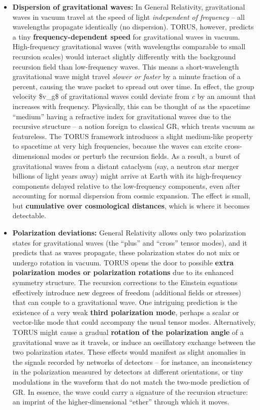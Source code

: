 \begin{itemize}
\item
  \textbf{Dispersion of gravitational waves:} In General Relativity,
  gravitational waves in vacuum travel at the speed of light
  \emph{independent of frequency} -- all wavelengths propagate
  identically (no dispersion). TORUS, however, predicts a tiny
  \textbf{frequency-dependent speed} for gravitational waves in vacuum​.
  High-frequency gravitational waves (with wavelengths comparable to
  small recursion scales) would interact slightly differently with the
  background recursion field than low-frequency waves. This means a
  short-wavelength gravitational wave might travel \emph{slower or
  faster} by a minute fraction of a percent, causing the wave packet to
  spread out over time. In effect, the group velocity \$v\_g\$ of
  gravitational waves could deviate from \emph{c} by an amount that
  increases with frequency​. Physically, this can be thought of as the
  spacetime ``medium'' having a refractive index for gravitational waves
  due to the recursive structure -- a notion foreign to classical GR,
  which treats vacuum as featureless. The TORUS framework introduces a
  slight medium-like property to spacetime at very high frequencies,
  because the waves can excite cross-dimensional modes or perturb the
  recursion fields. As a result, a burst of gravitational waves from a
  distant cataclysm (say, a neutron star merger billions of light years
  away) might arrive at Earth with its high-frequency components delayed
  relative to the low-frequency components, even after accounting for
  normal dispersion from cosmic expansion. The effect is small, but
  \textbf{cumulative over cosmological distances}, which is where it
  becomes detectable​.
\item
  \textbf{Polarization deviations:} General Relativity allows only two
  polarization states for gravitational waves (the ``plus'' and
  ``cross'' tensor modes), and it predicts that as waves propagate,
  these polarization states do not mix or undergo rotation in vacuum.
  TORUS opens the door to possible \textbf{extra polarization modes or
  polarization rotations} due to its enhanced symmetry structure. The
  recursion corrections to the Einstein equations effectively introduce
  new degrees of freedom (additional fields or stresses) that can couple
  to a gravitational wave. One intriguing prediction is the existence of
  a very weak \textbf{third polarization mode}, perhaps a scalar or
  vector-like mode that could accompany the usual tensor modes​.
  Alternatively, TORUS might cause a gradual \textbf{rotation of the
  polarization angle} of a gravitational wave as it travels, or induce
  an oscillatory exchange between the two polarization states. These
  effects would manifest as slight anomalies in the signals recorded by
  networks of detectors -- for instance, an inconsistency in the
  polarization measured by detectors at different orientations, or tiny
  modulations in the waveform that do not match the two-mode prediction
  of GR. In essence, the wave could carry a signature of the recursion
  structure: an imprint of the higher-dimensional ``ether'' through
  which it moves.
\end{itemize}


